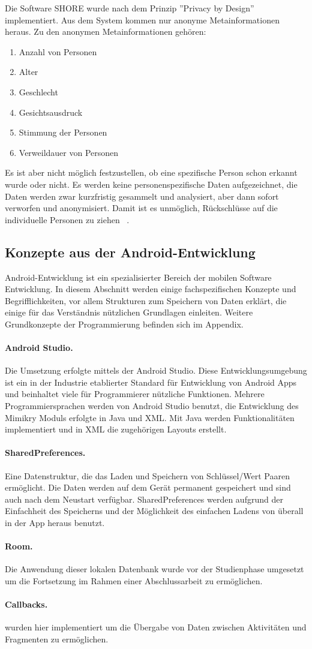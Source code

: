 Die Software SHORE wurde nach dem Prinzip ''Privacy by Design'' implementiert.
Aus dem System kommen nur anonyme Metainformationen heraus.
Zu den anonymen Metainformationen gehören:
\begin{enumerate}
\item Anzahl von Personen
\item Alter
\item Geschlecht
\item Gesichtsausdruck
\item Stimmung der Personen
\item Verweildauer von Personen
\end{enumerate}
Es ist aber nicht möglich festzustellen, ob eine spezifische Person schon erkannt wurde oder nicht. 
Es werden keine personenspezifische Daten aufgezeichnet, die Daten werden zwar kurzfristig gesammelt und analysiert, aber dann sofort verworfen und anonymisiert. Damit ist es unmöglich, Rückschlüsse auf die individuelle Personen zu ziehen
~\cite{Kueblbeck}.

\subsection{Konzepte aus der Android-Entwicklung}
Android-Entwicklung ist ein spezialisierter Bereich der mobilen Software Entwicklung. In diesem Abschnitt werden einige fachspezifischen Konzepte und Begrifflichkeiten, vor allem Strukturen zum Speichern von Daten erklärt, die einige für das Verständnis nützlichen Grundlagen einleiten.
Weitere Grundkonzepte der Programmierung befinden sich im Appendix.

\paragraph{Android Studio.} Die Umsetzung erfolgte mittels der Android Studio. Diese Entwicklungsumgebung ist ein in der Industrie etablierter Standard für Entwicklung von Android Apps und beinhaltet viele für Programmierer nützliche Funktionen. Mehrere Programmiersprachen werden von Android Studio benutzt, die Entwicklung des Mimikry Moduls erfolgte in Java und XML. Mit Java werden Funktionalitäten implementiert und in XML die zugehörigen Layouts erstellt.

\paragraph{SharedPreferences.}Eine Datenstruktur, die das Laden und Speichern von Schlüssel/Wert Paaren ermöglicht. Die Daten werden auf dem Gerät permanent gespeichert und sind auch nach dem Neustart verfügbar. SharedPreferences werden aufgrund der Einfachheit des Speicherns und der Möglichkeit des einfachen Ladens von überall in der App heraus benutzt.

\paragraph{Room.}Die Anwendung dieser lokalen Datenbank wurde vor der Studienphase umgesetzt um die Fortsetzung im Rahmen einer Abschlussarbeit zu ermöglichen.

\paragraph{Callbacks.} wurden hier implementiert um die Übergabe von Daten zwischen Aktivitäten und Fragmenten zu ermöglichen.
